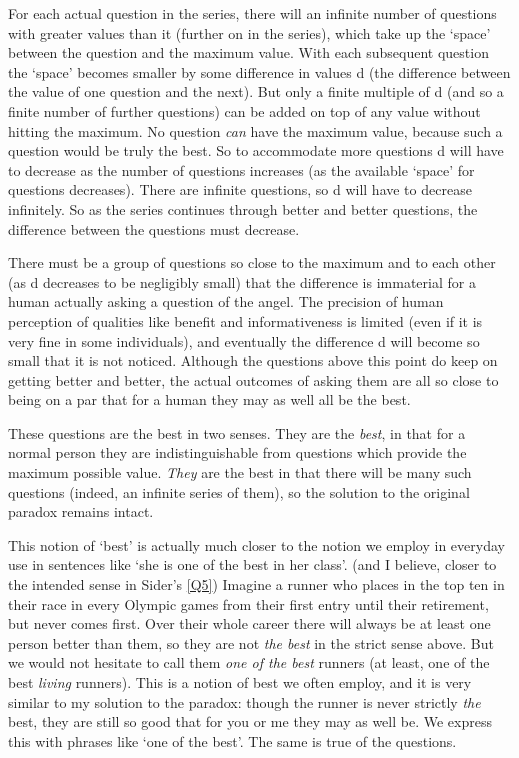 For each actual question in the series, there will an infinite number of questions with greater values than it (further on in the series), which take up the `space' between the question and the maximum value.
With each subsequent question the `space' becomes smaller by some difference in values d (the difference between the value of one question and the next).
But only a finite multiple of d (and so a finite number of further questions) can be added on top of any value without hitting the maximum.
No question \emph{can} have the maximum value, because such a question would be truly the best.
So to accommodate more questions d will have to decrease as the number of questions increases (as the available `space' for questions decreases).
There are infinite questions, so d will have to decrease infinitely.
So as the series continues through better and better questions, the difference between the questions must decrease.

There must be a group of questions so close to the maximum and to each other (as d decreases to be negligibly small) that the difference is immaterial for a human actually asking a question of the angel.
The precision of human perception of qualities like benefit and informativeness is limited (even if it is very fine in some individuals), and eventually the difference d will become so small that it is not noticed.
Although the questions above this point do keep on getting better and better, the actual outcomes of asking them are all so close to being on a par that for a human they may as well all be the best.

These questions are the best in two senses.
They are the \emph{best}, in that for a normal person they are indistinguishable from questions which provide the maximum possible value.
\emph{They} are the best in that there will be many such questions (indeed, an infinite series of them), so the solution to the original paradox remains intact.

This notion of `best' is actually much closer to the notion we employ in everyday use in sentences like `she is one of the best in her class'. (and I believe, closer to the intended sense in Sider's \ref{Q5})
Imagine a runner who places in the top ten in their race in every Olympic games from their first entry until their retirement, but never comes first.
Over their whole career there will always be at least one person better than them, so they are not \emph{the best} in the strict sense above.
But we would not hesitate to call them \emph{one of the best} runners (at least, one of the best \emph{living} runners).
This is a notion of best we often employ, and it is very similar to my solution to the paradox: though the runner is never strictly \emph{the} best, they are still so good that for you or me they may as well be.
We express this with phrases like `one of the best'.
The same is true of the questions.

